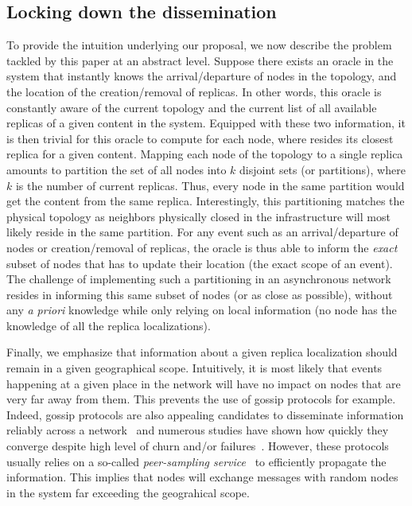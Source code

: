 \subsection*{Locking down the dissemination}
To provide the intuition underlying our proposal, we now describe the problem tackled by this paper at an abstract level. 
Suppose there exists an oracle in the system that instantly knows the arrival/departure of nodes in the topology, and the location of the creation/removal of replicas. In other words, this oracle is constantly aware of the current topology and the current list of all available replicas of a given content in the system. Equipped with these two information, it is then trivial for this oracle to compute for each node, where resides its closest replica for a given content. Mapping each node of the topology to a single replica amounts to partition the set of all nodes into $k$ disjoint sets (or partitions), where $k$ is the number of current replicas. Thus, every node in the same partition would get the content from the same replica. Interestingly, this partitioning matches the physical topology as neighbors physically closed in the infrastructure will most likely reside in the same partition.
For any event such as an arrival/departure of nodes or creation/removal of replicas, the oracle is thus able to inform the \textit{exact} subset of nodes that has to update their location (\ie the exact scope of an event). 
The challenge of implementing such a partitioning in an asynchronous network resides in informing this same subset of nodes (or as close as possible), without any \textit{a priori} knowledge while only relying on local information (\ie no node has the knowledge of all the replica localizations).


Finally, we emphasize that information about a given replica localization should remain in a given geographical scope. 
Intuitively, it is most likely that events happening at a given place in the network will have no impact on nodes that are very far away from them.
This prevents the use of gossip protocols for example.  Indeed, gossip protocols are also appealing candidates to disseminate information reliably across a network~\cite{epidemic-protocol} and numerous studies have shown how quickly they converge despite high level of churn and/or failures~\cite{lpbcast}.
However, these protocols usually relies on a so-called \textit{peer-sampling service}~\cite{jelasity2007gossip} to efficiently propagate the information. This implies that nodes will exchange messages with random nodes in the system far exceeding the geograhical scope. 

